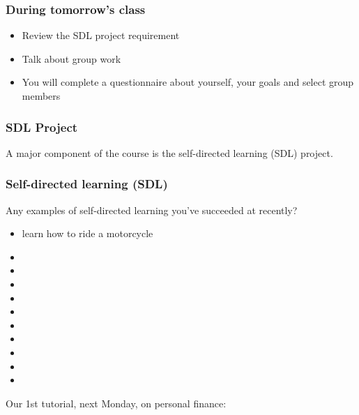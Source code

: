 \begin{frame}\frametitle{During tomorrow's class}
	\begin{itemize}
		\item	Review the SDL project requirement
		\item	Talk about group work
		\item	You will complete a questionnaire about yourself, your goals and select group members
	\end{itemize}
\end{frame}


\begin{frame}\frametitle{SDL Project}
	A major component of the course is the self-directed learning (SDL) project.
\end{frame}

\begin{frame}\frametitle{Self-directed learning (SDL)}
	Any examples of self-directed learning you've succeeded at recently?
	\begin{itemize}
		\item	learn how to ride a motorcycle
		\item	\iftoggle{instructor}{how to fix drywall}{}
		\item	\iftoggle{instructor}{change your car's oil}{}		
		\item	\iftoggle{instructor}{fix plumbing in your apartment}{}
		\item	\iftoggle{instructor}{cook an ethnic food dish to impress your date/partner}{}
		\item	\iftoggle{instructor}{something learned during your co-op work term?}{}
		\item	\iftoggle{instructor}{going through process of buying a car or a house}{}
		\item	\iftoggle{instructor}{plant, grow and maintain your own vegetables}{}
		\item	\iftoggle{instructor}{learn a new language for travel/pleasure}{}
		\item	\iftoggle{instructor}{start your own company and run it: what is required?}{}
		\item	\iftoggle{instructor}{figure out if I'm better off buying a new car or a used car?}{}
	\end{itemize}
	\vspace{12pt}
	Our 1st tutorial, next Monday, on personal finance: {\small \color{myOrange}{completely SDL}}
\end{frame}

